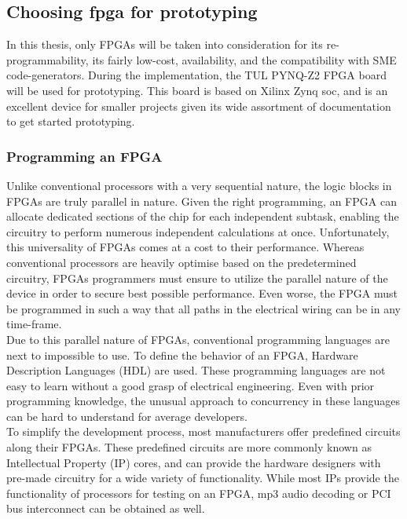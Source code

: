 \subsection{Choosing \gls{fpga} for prototyping}
In this thesis, only FPGAs will be taken into consideration for
its re-programmability, its fairly low-cost, availability, and the
compatibility with SME code-generators. During the implementation, the
TUL PYNQ\texttrademark-Z2 FPGA board will be used for prototyping. This
board is based on Xilinx Zynq \gls{soc}, and is an excellent device
for smaller projects given its wide assortment of documentation to get
started prototyping.\cite{tul_pynq}





\subsubsection{Programming an FPGA}
Unlike conventional processors with a very sequential nature, the logic blocks
in FPGAs are truly parallel in nature. Given the right programming, an FPGA can
allocate 
dedicated sections of the chip for each independent subtask, enabling
the circuitry to perform numerous independent calculations at once\cite{ni_fpga}.
Unfortunately, this universality of FPGAs comes at a cost to their performance.
Whereas conventional processors are heavily optimise based on the predetermined
circuitry, FPGAs programmers must ensure to utilize the parallel nature of the
device in order to secure best possible performance.
Even worse, the FPGA must
be programmed in such a way that all paths in the electrical wiring can be
in any time-frame.\\
Due to this parallel nature of FPGAs, conventional programming languages are
next to impossible to use. To define the behavior of an FPGA, Hardware
Description Languages (HDL) are used. These programming languages are not easy
to learn without a good grasp of electrical engineering. Even with prior
programming knowledge, the unusual approach to concurrency in these languages
can be hard to understand for average developers.\\
To simplify the development process, most manufacturers offer predefined
circuits along their FPGAs. These predefined circuits are more commonly known
as Intellectual Property (IP) cores, and can provide the hardware designers
with pre-made circuitry for a wide variety of functionality. While most IPs
provide the functionality of processors for testing\cite{intel_ip_core_80186EC}
on an FPGA, mp3 audio decoding or PCI bus interconnect can be obtained as
well\cite{fpga_for_dummies}.



